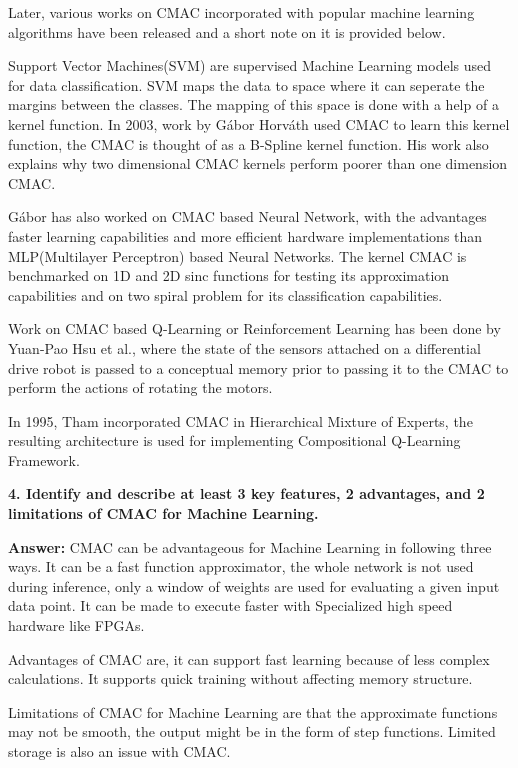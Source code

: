 \documentclass[a4paper, 10pt]{article}
\begin{document}
Later, various works on CMAC incorporated with popular machine learning algorithms have been released and a short note on it is provided below.

Support Vector Machines(SVM) are supervised Machine Learning models used for data classification. SVM maps the data to space where it can seperate the margins between the classes. The mapping of this space is done with a help of a kernel function. In 2003, work by Gábor Horváth\cite{svmCMAC} used CMAC to learn this kernel function, the CMAC is thought of as a B-Spline kernel function. His work also explains why two dimensional CMAC kernels perform poorer than one dimension CMAC.

Gábor has also worked on CMAC based Neural Network\cite{kernelCMAC}, with the advantages faster learning capabilities and more efficient hardware implementations than MLP(Multilayer Perceptron) based Neural Networks. The kernel CMAC is benchmarked on 1D and 2D sinc functions for testing its approximation capabilities and on two spiral problem for its classification capabilities.

Work on CMAC based Q-Learning or Reinforcement Learning has been done by Yuan-Pao Hsu et al.\cite{qCMAC}, where the state of the sensors attached on a differential drive robot is passed to a conceptual memory prior to passing it to the CMAC to perform the actions of rotating the motors.

In 1995, Tham\cite{reinforcemetCMAC} incorporated CMAC in Hierarchical Mixture of Experts, the resulting architecture is used for implementing Compositional Q-Learning Framework.


\hfill

\textbf{4. Identify and describe at least 3 key features, 2 advantages, and 2 limitations of CMAC for Machine Learning.}

\textbf{Answer:}
CMAC can be advantageous for Machine Learning in following three ways. It can be a fast function approximator, the whole network is not used during inference, only a window of weights are used for evaluating a given input data point. It can be made to execute faster with Specialized high speed hardware like FPGAs. 
 
Advantages of CMAC are, it can support fast learning because of less complex calculations. It supports quick training without affecting memory structure. 

Limitations of CMAC for Machine Learning are that the approximate functions may not be smooth, the output might be in the form of step functions. Limited storage is also an issue with CMAC. 
\end{document}

